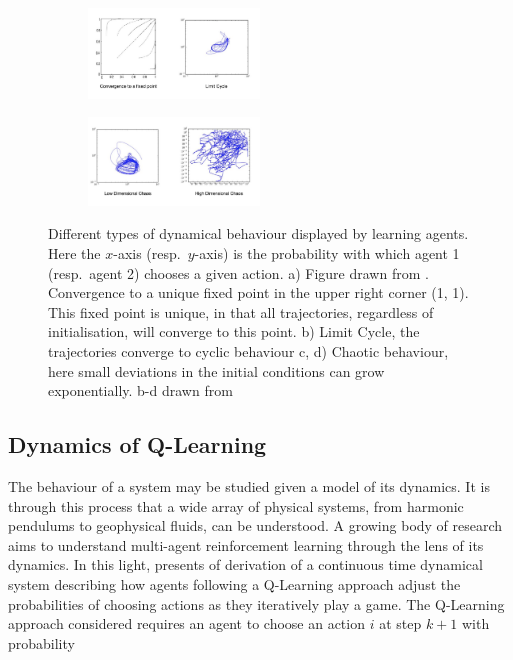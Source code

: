 \documentclass[sigconf]{aamas}
\begin{document}
    \begin{figure}[h]
        \centering
        
        \begin{subfigure}[b]{0.9 \textwidth}
        \includegraphics[width=0.5\textwidth]{Figures/DynamicalBehavioursTop.png}
        \end{subfigure}
        
        \begin{subfigure}[b]{0.9 \textwidth}
        \includegraphics[width=0.5\textwidth]{Figures/DynamicalBehaviourschaos.png}
        \end{subfigure}
        
        \caption{ \label{fig::DynamicalBehaviours} Different types of dynamical behaviour
       displayed
        by learning agents. Here the $x$-axis (resp.~$y$-axis) is the probability with which agent 1 (resp.~agent 2) chooses a given action. a) Figure drawn from \cite{Tuyls2006AnGames}.
        Convergence
        to a unique fixed point in the upper right corner (1, 1). This fixed point is unique, in
        that all trajectories, regardless of initialisation, will converge to this point. b) Limit Cycle, the trajectories converge to cyclic behaviour c,
        d) Chaotic behaviour, here small deviations in the initial conditions can grow
        exponentially. b-d drawn from \cite{Sanders2018}}

    \end{figure}

\subsection{Dynamics of Q-Learning}

The behaviour of a system may be studied given a model of its
dynamics. It is through this process that a wide array of physical
systems, from harmonic pendulums to geophysical fluids, can be
understood. A growing body of research aims to understand
multi-agent reinforcement learning through the lens of its
dynamics. In this light, \cite{Tuyls2006AnGames} presents of derivation of a continuous time dynamical
system describing how agents following a Q-Learning approach adjust the probabilities of choosing actions
as they iteratively play a game. The Q-Learning approach considered requires an agent to choose an action $i$ at step $k+1$ with probability
\end{document}
